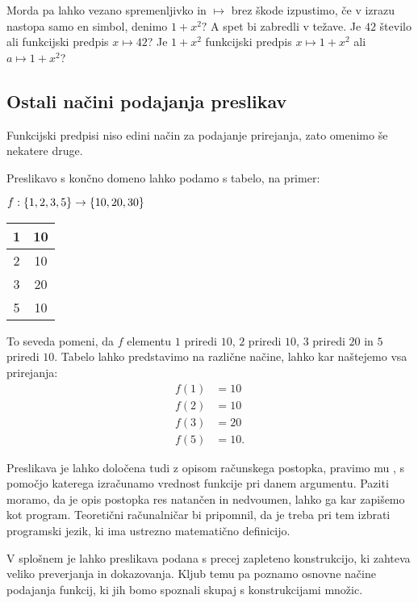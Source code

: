 Morda pa lahko vezano spremenljivko in $\mapsto$ brez škode izpustimo, če v izrazu nastopa
samo en simbol, denimo $1 + x^2?$
%
A spet bi zabredli v težave. Je $42$ število ali funkcijski predpis $x \mapsto 42$? Je
$1 + x^2$ funkcijski predpis $x \mapsto 1 + x^2$ ali $a \mapsto 1 + x^2$?

\subsection{Ostali načini podajanja preslikav}
\label{sec:ostali-predpisi}

Funkcijski predpisi niso edini način za podajanje prirejanja, zato omenimo še nekatere
druge.

Preslikavo s končno domeno lahko podamo s tabelo, na primer:
%
\begin{center}
  $f : \set{1, 2, 3, 5} \to \set{10, 20, 30}$

  \medskip

  \begin{tabular}{|c|c|} \hline
    1 & 10 \\ \hline
    2 & 10 \\ \hline
    3 & 20 \\ \hline
    5 & 10 \\ \hline
  \end{tabular}
\end{center}
%
To seveda pomeni, da $f$ elementu $1$ priredi $10$, $2$ priredi $10$, $3$ priredi $20$ in $5$
priredi $10$. Tabelo lahko predstavimo na različne načine, lahko kar naštejemo vsa prirejanja:
%
\begin{align*}
  f(1) &= 10 \\
  f(2) &= 10 \\
  f(3) &= 20 \\
  f(5) &= 10.
\end{align*}

Preslikava je lahko določena tudi z opisom računskega postopka, pravimo mu ,
s pomočjo katerega izračunamo vrednost funkcije pri danem argumentu. Paziti moramo, da je
opis postopka res natančen in nedvoumen, lahko ga kar zapišemo kot program. Teoretični
računalničar bi pripomnil, da je treba pri tem izbrati programski jezik, ki ima ustrezno
matematično definicijo.

V splošnem je lahko preslikava podana s precej zapleteno konstrukcijo, ki zahteva veliko
preverjanja in dokazovanja. Kljub temu pa poznamo osnovne načine podajanja funkcij, ki jih
bomo spoznali skupaj s konstrukcijami množic.


